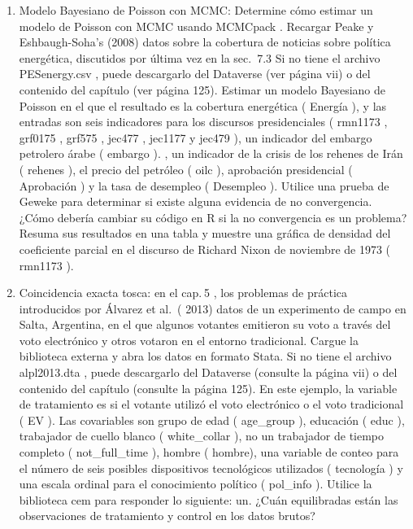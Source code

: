 \documentclass[
]{book}
\begin{document}
\begin{enumerate}
\def\labelenumi{\arabic{enumi}.}
\setcounter{enumi}{1}
\item
  Modelo Bayesiano de Poisson con MCMC: Determine cómo estimar un modelo de Poisson con MCMC usando MCMCpack . Recargar Peake y Eshbaugh-Soha's (2008) datos sobre la cobertura de noticias sobre política energética, discutidos por última vez en la sec.~7.3 Si no tiene el archivo PESenergy.csv , puede descargarlo del Dataverse (ver página vii) o del contenido del capítulo (ver página 125). Estimar un modelo Bayesiano de Poisson en el que el resultado es la cobertura energética ( Energía ), y las entradas son seis indicadores para los discursos presidenciales ( rmn1173 , grf0175 , grf575 , jec477 , jec1177 y jec479 ), un indicador del embargo petrolero árabe ( embargo ). , un indicador de la crisis de los rehenes de Irán ( rehenes ), el precio del petróleo ( oilc ), aprobación presidencial ( Aprobación ) y la tasa de desempleo ( Desempleo ). Utilice una prueba de Geweke para determinar si existe alguna evidencia de no convergencia. ¿Cómo debería cambiar su código en R si la no convergencia es un problema? Resuma sus resultados en una tabla y muestre una gráfica de densidad del coeficiente parcial en el discurso de Richard Nixon de noviembre de 1973 ( rmn1173 ).
\item
  Coincidencia exacta tosca: en el cap. 5 , los problemas de práctica introducidos por Álvarez et al.~( 2013) datos de un experimento de campo en Salta, Argentina, en el que algunos votantes emitieron su voto a través del voto electrónico y otros votaron en el entorno tradicional. Cargue la biblioteca externa y abra los datos en formato Stata. Si no tiene el archivo alpl2013.dta , puede descargarlo del Dataverse (consulte la página vii) o del contenido del capítulo (consulte la página 125). En este ejemplo, la variable de tratamiento es si el votante utilizó el voto electrónico o el voto tradicional ( EV ). Las covariables son grupo de edad ( age\_group ), educación ( educ ), trabajador de cuello blanco ( white\_collar ), no un trabajador de tiempo completo ( not\_full\_time ), hombre ( hombre), una variable de conteo para el número de seis posibles dispositivos tecnológicos utilizados ( tecnología ) y una escala ordinal para el conocimiento político ( pol\_info ). Utilice la biblioteca cem para responder lo siguiente:
  un.
  ¿Cuán equilibradas están las observaciones de tratamiento y control en los datos brutos?
\end{enumerate}
\end{document}
